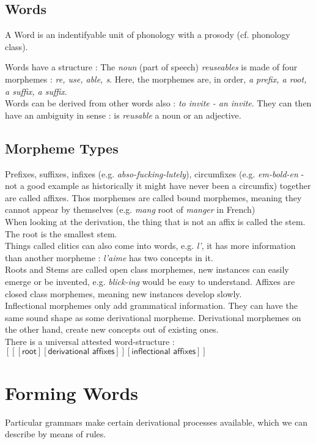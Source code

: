 \documentclass{cours}
\begin{document}
\subsection{Words}
A Word is an indentifyable unit of phonology with a prosody (cf. phonology class).

Words have a structure : The \emph{noun} (part of speech) \textsl{reuseables} is made of four morphemes : \textsl{re, use, able, s}. Here, the morphemes are, in order, \textsl{a prefix, a root, a suffix, a suffix}. \\
Words can be derived from other words also : \textsl{to invite - an invite}. They can then have an ambiguity in sense : is \textsl{reusable} a noun or an adjective.\\

\subsection{Morpheme Types}
Prefixes, suffixes, infixes (e.g. \textsl{abso-\emph{fucking}-lutely}), circumfixes (e.g. \textsl{\emph{em}-bold-\emph{en}} - not a good example as historically it might have never been a circumfix) together are called affixes. Thos morphemes are called bound morphemes, meaning they cannot appear by themselves (e.g. \textsl{mang} root of \textit{manger} in French)\\  
When looking at the derivation, the thing that is not an affix is called the stem. The root is the smallest stem. \\
Things called clitics can also come into words, e.g. \textsl{l'}, it has more information than another morpheme : \textsl{l'aime} has two concepts in it.\\
Roots and Stems are called open class morphemes, new instances can easily emerge or be invented, e.g. \textsl{blick-ing} would be easy to understand. Affixes are closed class morphemes, meaning new instances develop slowly.\\

Inflectional morphemes only add grammatical information. They can have the same sound shape as some derivational morpheme. Derivational morphemes on the other hand, create new concepts out of existing ones.\\

There is a universal attested word-structure : $\left[\left[\left[\textsf{root}\right]\left[\textsf{derivational affixes}\right]\right]\left[\textsf{inflectional affixes}\right]\right]$

\section{Forming Words}
Particular grammars make certain derivational processes available, which we can describe by means of rules.
\end{document}
